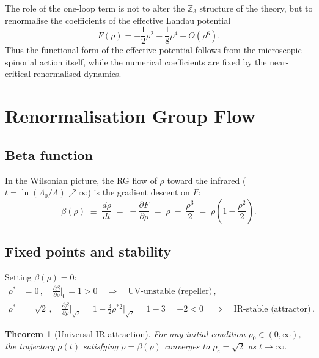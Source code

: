 \documentclass[12pt,a4paper]{article}
\newtheorem{theorem}{Theorem}
\theoremstyle{definition}
\newcommand{\rhoc}{\rho_{\mathrm{c}}}
\begin{document}
The role of the one-loop term is not to alter the $\mathbb{Z}_3$
structure of the theory, but to renormalise the coefficients of the
effective Landau potential
\[
F(\rho)
=
-\frac12\rho^2+\frac18\rho^4+O(\rho^6).
\]
Thus the functional form of the effective potential follows from the
microscopic spinorial action itself, while the numerical coefficients
are fixed by the near-critical renormalised dynamics.

\section{Renormalisation Group Flow}
\label{sec:rg}

\subsection{Beta function}

In the Wilsonian picture, the RG flow of $\rho$ toward the infrared
($t = \ln(\Lambda_0/\Lambda) \nearrow \infty$) is the gradient descent on $F$:
\begin{equation}
  \label{eq:beta}
  \boxed{
  \beta(\rho) \;\equiv\; \frac{d\rho}{dt}
  \;=\; -\frac{\partial F}{\partial \rho}
  \;=\; \rho \;-\; \frac{\rho^3}{2}
  \;=\; \rho\!\left(1 - \frac{\rho^2}{2}\right).}
\end{equation}

\subsection{Fixed points and stability}

Setting $\beta(\rho) = 0$:
\begin{align}
  \rho^* &= 0\,, \quad
  \frac{\partial\beta}{\partial\rho}\bigg|_0 = 1 > 0
  \quad\Rightarrow\quad \text{UV-unstable (repeller)}\,,\\
  \rho^* &= \sqrt{2}\,, \quad
  \frac{\partial\beta}{\partial\rho}\bigg|_{\sqrt{2}}
  = 1 - \tfrac{3}{2}\rho^{*2}\big|_{\sqrt{2}} = 1 - 3 = -2 < 0
  \quad\Rightarrow\quad \text{IR-stable (attractor)}\,.
\end{align}

\begin{theorem}[Universal IR attraction]
\label{thm:rg}
For any initial condition $\rho_0 \in (0,\infty)$, the trajectory
$\rho(t)$ satisfying $\dot\rho = \beta(\rho)$ converges to $\rhoc = \sqrt{2}$
as $t \to \infty$.
\end{theorem}
\end{document}
